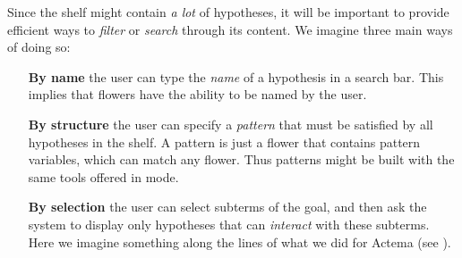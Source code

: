 Since the shelf might contain \emph{a lot} of hypotheses, it will be important
to provide efficient ways to \emph{filter} or \emph{search} through its content.
We imagine three main ways of doing so:
\begin{itemize}
  \item[\textbf{By name}] the user can type the \emph{name} of a hypothesis in a
  search bar. This implies that flowers have the ability to be named by the
  user.
  \item[\textbf{By structure}] the user can specify a \emph{pattern} that must
  be satisfied by all hypotheses in the shelf. A pattern is just a flower that
  contains pattern variables, which can match any flower. Thus patterns might be
  built with the same tools offered in \Edit mode.
  \item[\textbf{By selection}] the user can select subterms of the goal, and
  then ask the system to display only hypotheses that can \emph{interact} with
  these subterms. Here we imagine something along the lines of what we did for
  Actema (see ).
\end{itemize}




